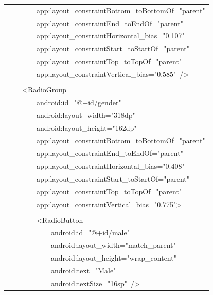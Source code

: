 \documentclass[a4paper,12pt]{article}
\begin{document}
\begin{longtable}{|p{}|}
{\ttfamily\small \ \ \ \ \ \ \ \ app:layout\_constraintBottom\_toBottomOf="parent"} \\
{\ttfamily\small \ \ \ \ \ \ \ \ app:layout\_constraintEnd\_toEndOf="parent"} \\
{\ttfamily\small \ \ \ \ \ \ \ \ app:layout\_constraintHorizontal\_bias="0.107"} \\
{\ttfamily\small \ \ \ \ \ \ \ \ app:layout\_constraintStart\_toStartOf="parent"} \\
{\ttfamily\small \ \ \ \ \ \ \ \ app:layout\_constraintTop\_toTopOf="parent"} \\
{\ttfamily\small \ \ \ \ \ \ \ \ app:layout\_constraintVertical\_bias="0.585"\ /\textgreater{}} \\
\strut \\
{\ttfamily\small \ \ \ \ \textless{}RadioGroup} \\
{\ttfamily\small \ \ \ \ \ \ \ \ android:id="@+id/gender"} \\
{\ttfamily\small \ \ \ \ \ \ \ \ android:layout\_width="318dp"} \\
{\ttfamily\small \ \ \ \ \ \ \ \ android:layout\_height="162dp"} \\
{\ttfamily\small \ \ \ \ \ \ \ \ app:layout\_constraintBottom\_toBottomOf="parent"} \\
{\ttfamily\small \ \ \ \ \ \ \ \ app:layout\_constraintEnd\_toEndOf="parent"} \\
{\ttfamily\small \ \ \ \ \ \ \ \ app:layout\_constraintHorizontal\_bias="0.408"} \\
{\ttfamily\small \ \ \ \ \ \ \ \ app:layout\_constraintStart\_toStartOf="parent"} \\
{\ttfamily\small \ \ \ \ \ \ \ \ app:layout\_constraintTop\_toTopOf="parent"} \\
{\ttfamily\small \ \ \ \ \ \ \ \ app:layout\_constraintVertical\_bias="0.775"\textgreater{}} \\
\strut \\
{\ttfamily\small \ \ \ \ \ \ \ \ \textless{}RadioButton} \\
{\ttfamily\small \ \ \ \ \ \ \ \ \ \ \ \ android:id="@+id/male"} \\
{\ttfamily\small \ \ \ \ \ \ \ \ \ \ \ \ android:layout\_width="match\_parent"} \\
{\ttfamily\small \ \ \ \ \ \ \ \ \ \ \ \ android:layout\_height="wrap\_content"} \\
{\ttfamily\small \ \ \ \ \ \ \ \ \ \ \ \ android:text="Male"} \\
{\ttfamily\small \ \ \ \ \ \ \ \ \ \ \ \ android:textSize="16sp"\ /\textgreater{}} \\

\end{longtable}
\end{document}
